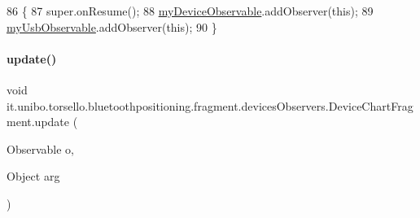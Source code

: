 \begin{DoxyCode}
86                            \{
87         super.onResume();
88         \hyperlink{classit_1_1unibo_1_1torsello_1_1bluetoothpositioning_1_1fragment_1_1devicesObservers_1_1DeviceChartFragment_a2c8de6418fffdb5affe4de22185b55eb_a2c8de6418fffdb5affe4de22185b55eb}{myDeviceObservable}.addObserver(\textcolor{keyword}{this});
89         \hyperlink{classit_1_1unibo_1_1torsello_1_1bluetoothpositioning_1_1fragment_1_1devicesObservers_1_1DeviceChartFragment_a577dad67b3eabc0f48e95d08e9f5881b_a577dad67b3eabc0f48e95d08e9f5881b}{myUsbObservable}.addObserver(\textcolor{keyword}{this});
90     \}
\end{DoxyCode}
\hypertarget{classit_1_1unibo_1_1torsello_1_1bluetoothpositioning_1_1fragment_1_1devicesObservers_1_1DeviceChartFragment_a83fb3f76a108192b8df7640cfafcd98d_a83fb3f76a108192b8df7640cfafcd98d}{}\label{classit_1_1unibo_1_1torsello_1_1bluetoothpositioning_1_1fragment_1_1devicesObservers_1_1DeviceChartFragment_a83fb3f76a108192b8df7640cfafcd98d_a83fb3f76a108192b8df7640cfafcd98d} 
\paragraph{\texorpdfstring{update()}{update()}}
{\footnotesize\ttfamily void it.\+unibo.\+torsello.\+bluetoothpositioning.\+fragment.\+devices\+Observers.\+Device\+Chart\+Fragment.\+update (\begin{DoxyParamCaption}\item[{Observable}]{o,  }\item[{Object}]{arg }\end{DoxyParamCaption})}


